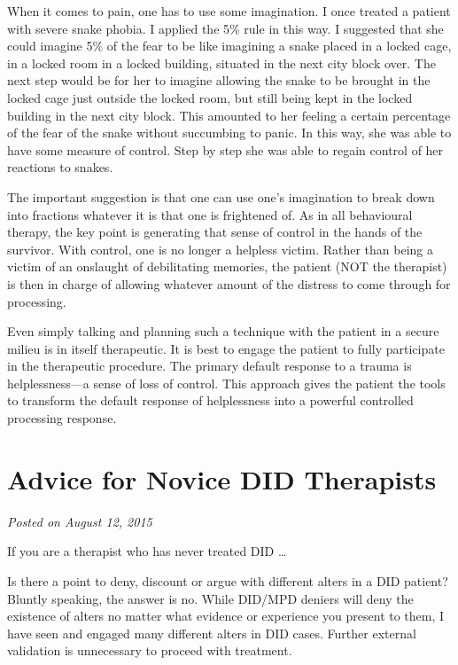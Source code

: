 \documentclass[]{book}
\begin{document}
When it comes to pain, one has to use some imagination. I once treated a patient with severe snake phobia. I applied the 5\% rule in this way. I suggested that she could imagine 5\% of the fear to be like imagining a snake placed in a locked cage, in a locked room in a locked building, situated in the next city block over. The next step would be for her to imagine allowing the snake to be brought in the locked cage just outside the locked room, but still being kept in the locked building in the next city block. This amounted to her feeling a certain percentage of the fear of the snake without succumbing to panic. In this way, she was able to have some measure of control. Step by step she was able to regain control of her reactions to snakes.

The important suggestion is that one can use one's imagination to break down into fractions whatever it is that one is frightened of. As in all behavioural therapy, the key point is generating that sense of control in the hands of the survivor. With control, one is no longer a helpless victim. Rather than being a victim of an onslaught of debilitating memories, the patient (NOT the therapist) is then in charge of allowing whatever amount of the distress to come through for processing.

Even simply talking and planning such a technique with the patient in a secure milieu is in itself therapeutic. It is best to engage the patient to fully participate in the therapeutic procedure. The primary default response to a trauma is helplessness---a sense of loss of control. This approach gives the patient the tools to transform the default response of helplessness into a powerful controlled processing response.

\hypertarget{advice-for-novice-did-therapists}{%
\section{Advice for Novice DID Therapists}\label{advice-for-novice-did-therapists}}

\emph{Posted on August 12, 2015}

If you are a therapist who has never treated DID \ldots{}

Is there a point to deny, discount or argue with different alters in a DID patient? Bluntly speaking, the answer is no. While DID/MPD deniers will deny the existence of alters no matter what evidence or experience you present to them, I have seen and engaged many different alters in DID cases. Further external validation is unnecessary to proceed with treatment.
\end{document}
